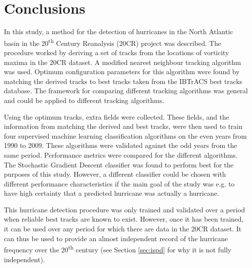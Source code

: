 \documentclass[pdftex,12pt,a4paper]{report}
\newcommand{\ts}{\textsuperscript}
\begin{document}
\chapter{Conclusions}
\label{chap:conclusion}

In this study, a method for the detection of hurricanes in the North Atlantic basin in the 20\ts{th}
Century Reanalysis (20CR) project was described. The procedure worked by deriving a set of tracks
from the locations of vorticity maxima in the 20CR dataset. A modified nearest neighbour tracking
algorithm was used. Optimum configuration parameters for this algorithm were found by matching the
derived tracks to best tracks taken from the IBTrACS best tracks database. The framework for
comparing different tracking algorithms was general and could be applied to different tracking
algorithms.

Using the optimum tracks, extra fields were collected. These fields, and the information from
matching the derived and best tracks, were then used to train four supervised machine learning
classification algorithms on the even years from 1990 to 2009. These algorithms were
validated against the odd years from the same period. Performance metrics were compared for the
different algorithms. The Stochastic Gradient Descent classifier was found to perform best for the
purposes of this study. However, a different classifier could be chosen with different performance
characteristics if the main goal of the study was e.g. to have high certainty that a predicted
hurricane was actually a hurricane.

This hurricane detection procedure was only trained and validated over a period when reliable best
tracks are known to exist. However, once it has been trained, it can be used over any period for
which there are data in the 20CR dataset. It can thus be used to provide an almost independent
record of the hurricane frequency over the 20\ts{th} century (see Section \ref{sec:ispd} for why it
is not fully independent).
\end{document}
